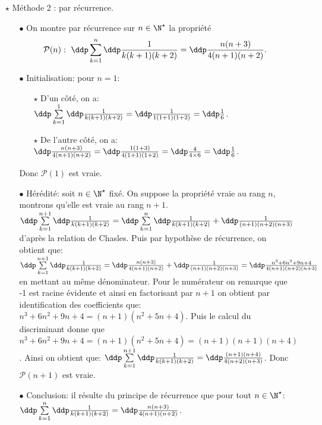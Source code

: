 \begin{correction}
\begin{enumerate}
\begin{itemize}
\item[$\star$] M\'ethode 2 : par r\'ecurrence.
\begin{itemize}
\item[$\bullet$] On montre par r\'ecurrence sur $n\in\N^{\star}$ la propri\'et\'e 
$$\mathcal{P}(n):\  \ddp \sum\limits_{k=1}^{n} \ddp\frac{1}{k(k+1)(k+2)}=\ddp\frac{n(n+3)}{4(n+1)(n+2)} .$$
\item[$\bullet$] Initialisation: pour $n=1$:
\begin{itemize}
\item[$\star$] D'un c\^{o}t\'e, on a: $\ddp \sum\limits_{k=1}^{1} \ddp\frac{1}{k(k+1)(k+2)}=\ddp\frac{1}{1(1+1)(1+2)}=\ddp\frac{1}{6}$.
\item[$\star$] De l'autre c\^{o}t\'e, on a: $\ddp\frac{n(n+3)}{4(n+1)(n+2)}=\ddp\frac{1(1+3)}{4(1+1)(1+2)}=\ddp\frac{4}{4\times 6}=\ddp\frac{1}{6}$.
\end{itemize}
Donc $\mathcal{P}(1)$ est vraie.
\item[$\bullet$] H\'er\'edit\'e: soit $n\in\N^{\star}$ fix\'e. On suppose la propri\'et\'e vraie au rang $n$, montrons qu'elle est vraie au rang $n+1$.\\
\noindent $\ddp \sum\limits_{k=1}^{n+1} \ddp\frac{1}{k(k+1)(k+2)}=\ddp \sum\limits_{k=1}^{n} \ddp\frac{1}{k(k+1)(k+2)}+\ddp\frac{1}{(n+1)(n+2)(n+3)}$ d'apr\`{e}s la relation de Chasles. Puis par hypoth\`{e}se de r\'ecurrence, on obtient que:
$\ddp \sum\limits_{k=1}^{n+1} \ddp\frac{1}{k(k+1)(k+2)}=\ddp\frac{n(n+3)}{4(n+1)(n+2)} +\ddp\frac{1}{(n+1)(n+2)(n+3)}=
\ddp\frac{n^3+6n^2+9n+4}{4(n+1)(n+2)(n+3)}$ en mettant au m\^{e}me d\'enominateur. Pour le num\'erateur on remarque que -1 est racine \'evidente et ainsi en factorisant par $n+1$ on obtient par identification des coefficients que: 
$n^3+6n^2+9n+4=(n+1)(n^2+5n+4)$. Puis le calcul du discriminant donne que $n^3+6n^2+9n+4=(n+1)(n^2+5n+4)=(n+1)(n+1)(n+4)$. Ainsi on obtient que: $\ddp \sum\limits_{k=1}^{n+1} \ddp\frac{1}{k(k+1)(k+2)}=\ddp\frac{(n+1)(n+4)}{4(n+2)(n+3)}$. Donc $\mathcal{P}(n+1)$ est vraie.  
\item[$\bullet$] Conclusion: il r\'esulte du principe de r\'ecurrence que pour tout $n\in\N^{\star}$: $\ddp \sum\limits_{k=1}^{n} \ddp\frac{1}{k(k+1)(k+2)}=\ddp\frac{n(n+3)}{4(n+1)(n+2)}$.
\end{itemize}
\end{itemize}
\end{enumerate}
\end{correction}